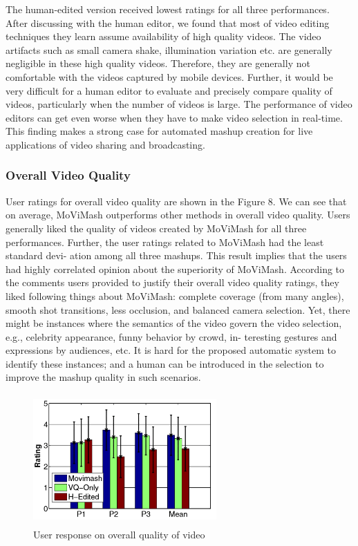 \documentclass{clsfile}
\begin{document}
The human-edited version received lowest ratings for all three
performances. After discussing with the human editor, we found
that most of video editing techniques they learn assume availability
of high quality videos. The video artifacts such as small camera shake, illumination variation etc. are generally negligible in these
high quality videos. Therefore, they are generally not comfortable
with the videos captured by mobile devices. Further, it would be
very difficult for a human editor to evaluate and precisely compare
quality of videos, particularly when the number of videos is large.
The performance of video editors can get even worse when they
have to make video selection in real-time. This finding makes a
strong case for automated mashup creation for live applications of
video sharing and broadcasting.

\subsubsection{Overall Video Quality}
User ratings for overall video quality are shown in the Figure 8.
We can see that on average, MoViMash outperforms other methods in overall video quality. Users generally liked the quality of
videos created by MoViMash for all three performances. Further,
the user ratings related to MoViMash had the least standard devi-
ation among all three mashups. This result implies that the users
had highly correlated opinion about the superiority of MoViMash.
According to the comments users provided to justify their overall
video quality ratings, they liked following things about MoViMash:
complete coverage (from many angles), smooth shot transitions,
less occlusion, and balanced camera selection. Yet, there might
be instances where the semantics of the video govern the video
selection, e.g., celebrity appearance, funny behavior by crowd, in-
teresting gestures and expressions by audiences, etc. It is hard for
the proposed automatic system to identify these instances; and a
human can be introduced in the selection to improve the mashup
quality in such scenarios.
\begin{figure}
\includegraphics[width=7cm, height=5cm]{fig8.png}
   \caption{ User response on overall quality of video}

\end{figure}
\end{document}
